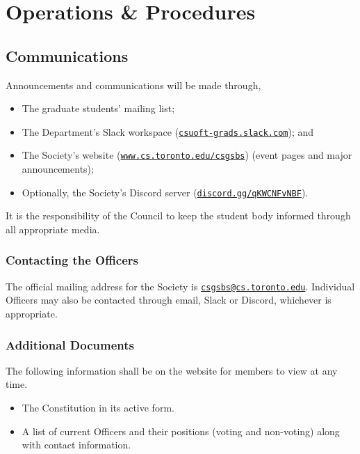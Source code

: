 \section{Operations \& Procedures}

\subsection{Communications}\label{sec:communications}
Announcements and communications will be made through,
\begin{itemize}
      \item The graduate students' mailing list;
      \item The Department's Slack workspace
            (\href{https://csuoft-grads.slack.com}{\texttt{csuoft-grads.slack.com}}); and
      \item The Society's website
            (\href{https://www.cs.toronto.edu/csgsbs}{\texttt{www.cs.toronto.edu/csgsbs}})
            (event pages and major announcements);
      \item Optionally, the Society's Discord server
            (\href{https://discord.gg/qKWCNFvNBF}{\texttt{discord.gg/qKWCNFvNBF}}).
\end{itemize}
It is the responsibility of the Council to keep the student body informed through all appropriate media.

\subsubsection{Contacting the Officers}
The official mailing address for the Society is
\href{mailto:csgsbs@cs.toronto.edu}{\texttt{csgsbs@cs.toronto.edu}}. Individual
Officers may also be contacted through email, Slack or Discord, whichever is
appropriate.

\subsubsection{Additional Documents}
The following information shall be on the website for members to view at any
time.

\begin{itemize}
      \item The Constitution in its active form.
      \item A list of current Officers and their positions (voting and non-voting) along
            with contact information.
\end{itemize}

